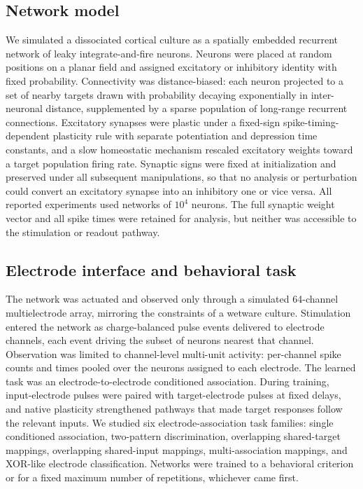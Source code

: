 \documentclass{article}
\begin{document}
\subsection*{Network model}

We simulated a dissociated cortical culture as a spatially embedded recurrent network of leaky integrate-and-fire neurons. Neurons were placed at random positions on a planar field and assigned excitatory or inhibitory identity with fixed probability. Connectivity was distance-biased: each neuron projected to a set of nearby targets drawn with probability decaying exponentially in inter-neuronal distance, supplemented by a sparse population of long-range recurrent connections. Excitatory synapses were plastic under a fixed-sign spike-timing-dependent plasticity rule with separate potentiation and depression time constants, and a slow homeostatic mechanism rescaled excitatory weights toward a target population firing rate. Synaptic signs were fixed at initialization and preserved under all subsequent manipulations, so that no analysis or perturbation could convert an excitatory synapse into an inhibitory one or vice versa. All reported experiments used networks of $10^4$ neurons. The full synaptic weight vector and all spike times were retained for analysis, but neither was accessible to the stimulation or readout pathway.

\subsection*{Electrode interface and behavioral task}

The network was actuated and observed only through a simulated 64-channel multielectrode array, mirroring the constraints of a wetware culture. Stimulation entered the network as charge-balanced pulse events delivered to electrode channels, each event driving the subset of neurons nearest that channel. Observation was limited to channel-level multi-unit activity: per-channel spike counts and times pooled over the neurons assigned to each electrode. The learned task was an electrode-to-electrode conditioned association. During training, input-electrode pulses were paired with target-electrode pulses at fixed delays, and native plasticity strengthened pathways that made target responses follow the relevant inputs. We studied six electrode-association task families: single conditioned association, two-pattern discrimination, overlapping shared-target mappings, overlapping shared-input mappings, multi-association mappings, and XOR-like electrode classification. Networks were trained to a behavioral criterion or for a fixed maximum number of repetitions, whichever came first.
\end{document}
